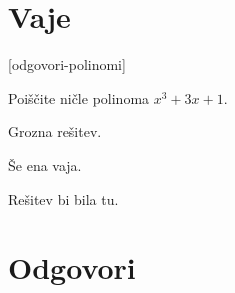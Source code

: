 \section{Vaje}
\label{sec:polinomi-funkcije-vaje}


\def\datotekaOdgovori{odgovori-polinomi}

[\datotekaOdgovori]

%



\begin{vaja}
  Poiščite ničle polinoma $x^3 + 3 x + 1$.

  \begin{odgovor}
    Grozna rešitev.
  \end{odgovor}
\end{vaja}

\begin{vaja}
  Še ena vaja.

  \begin{odgovor}
    Rešitev bi bila tu.
  \end{odgovor}
\end{vaja}




\section{Odgovori}
\label{sec:polinomi-odgovori}




